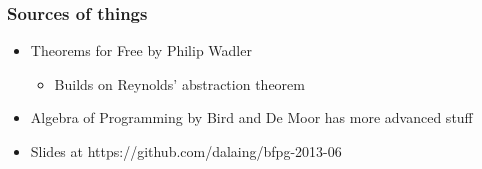\documentclass{beamer}
\begin{document}
\begin{frame}
    \frametitle{Sources of things}
    \begin{itemize}
        \item Theorems for Free by Philip Wadler
        \begin{itemize}
            \item Builds on Reynolds' abstraction theorem
        \end{itemize}
        \item Algebra of Programming by Bird and De Moor has more advanced stuff 
        \item Slides at https://github.com/dalaing/bfpg-2013-06
    \end{itemize}
\end{frame}
\end{document}
